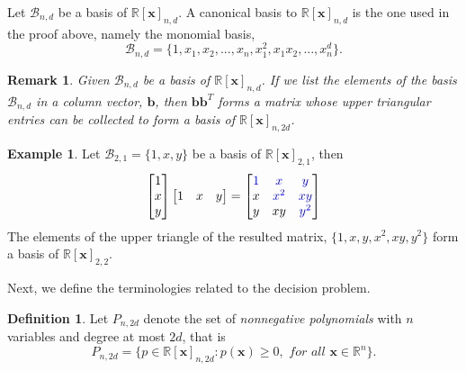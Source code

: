 \documentclass[12pt]{amsart}
\numberwithin{equation}{section}
\newtheorem{remark}[thm]{Remark}
\theoremstyle{definition}
\newtheorem{definition}[thm]{Definition}
\newtheorem{example}[thm]{Example}
\numberwithin{thm}{section}
\begin{document}
Let $\mathcal{B}_{n, d}$ be a basis of $\mathbb{R}[\mathbf{x}]_{n, d}$. 
A canonical basis to $\mathbb{R}[\mathbf{x}]_{n, d}$ is the one used in the proof above, 
namely the monomial basis,
\begin{equation*}
     \mathcal{B}_{n, d} = \{1, x_1, x_2, ..., x_n, x_1 ^ 2, x_1 x_2, ..., x_n^d\}.
\end{equation*}

\begin{remark}
     \label{rem:upgrade}
     Given $\mathcal{B}_{n, d}$ be a basis of $\mathbb{R}[\mathbf{x}]_{n, d}$. 
     If we list the elements of the basis $\mathcal{B}_{n, d}$ in a column vector, $\mathbf{b}$, 
     then $\mathbf{b} \mathbf{b}^T$ forms a matrix whose upper triangular
     entries can be collected to form a basis of $\mathbb{R}[\mathbf{x}]_{n, 2d}$.
\end{remark}

\begin{example}
     Let $\mathcal{B}_{2, 1} = \{1, x, y\}$ be a basis of $\mathbb{R}[\mathbf{x}]_{2, 1}$, then 
     \begin{equation*}
          \begin{bmatrix}
               1 \\
               x \\
               y
          \end{bmatrix}
          \begin{bmatrix}
               1 & x & y
          \end{bmatrix}
          = \begin{bmatrix}
               \color{blue} 1 & \color{blue}x & \color{blue}y \\
               x & \color{blue}x^2 & \color{blue}xy \\
               y & xy & \color{blue}y^2 \\
          \end{bmatrix}
     \end{equation*}
     The elements of the upper triangle of the resulted matrix, $\{1, x, y, x^2, xy, y^2\}$ form a basis of $\mathbb{R}[\mathbf{x}]_{2, 2}$.
\end{example}

\smallskip

Next, we define the terminologies related to the decision problem.

\begin{definition}
     \label{def:NGP}
     Let $P_{n, 2d}$ denote the set of \emph{nonnegative polynomials} with 
     $n$ variables and degree at most $2d$, that is 
     \begin{equation*}
          P_{n, 2d} = \{ p \in \mathbb{R}[\mathbf{x}]_{n, 2d}: p(\mathbf{x}) \geq 0, \textit{ for all } \mathbf{x} \in \mathbb{R}^n \}.
     \end{equation*}
\end{definition}
\end{document}
